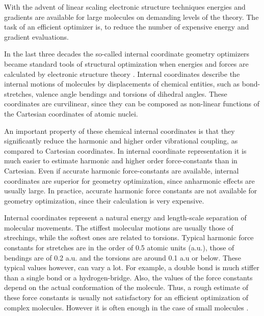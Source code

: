 \documentclass[prl,aps,twocolumn,showpacs,twocolumngrid,superbib]{revtex4}
\begin{document}
With the advent of linear scaling electronic structure techniques 
\cite{Goedecker99}
energies and gradients are available for large molecules on demanding
levels of the theory. 
The task of an efficient optimizer is, to reduce the number of
expensive energy and gradient evaluations.

In the last three decades the so-called internal coordinate 
geometry optimizers 
became standard tools of structural optimization when energies 
and forces are calculated by electronic structure theory 
\cite{Pulay_natural_internals}.
Internal coordinates describe the internal motions of molecules 
by displacements of chemical entities, such as bond-stretches, 
valence angle bendings and torsions of dihedral angles. These 
coordinates are curvilinear, since they can be composed
as non-linear functions of the Cartesian coordinates of atomic nuclei.

An important property of these chemical
internal coordinates
is that they significantly reduce the harmonic and higher order 
vibrational coupling, as compared to Cartesian coordinates. 
In internal coordinate representation it is much easier to estimate 
harmonic and higher order force-constants than in Cartesian. Even
if accurate harmonic force-constants are available, internal coordinates
are superior for geometry optimization, since anharmonic effects are
usually large. In practice, accurate harmonic force constants are 
not available for geometry optimization, since their calculation 
is very expensive.

Internal coordinates represent a natural energy and 
length-scale separation of molecular movements.
The stiffest molecular motions are usually those of strechings, while 
the softest ones are related to torsions. 
Typical harmonic force constants for stretches are in the order of 
0.5 atomic units (a.u.), those of bendings are of 0.2 a.u. and the
torsions are around 0.1 a.u or below. 
These typical values however, can vary a lot.
For example, a double bond is much stiffer than a single bond or 
a hydrogen-bridge. Also, the values of the force constants depend
on the actual conformation of the molecule. Thus, a rough estimate
of these force constants is usually not satisfactory 
for an efficient optimization
of complex molecules. However it is often enough in the case of small
molecules \cite{fogarasi_diaghess}.
\end{document}
